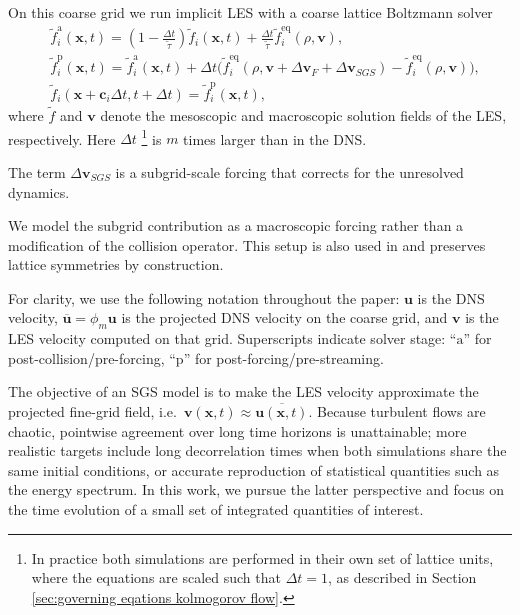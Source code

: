 \documentclass[]{elsarticle}
\begin{document}
On this coarse grid we run implicit LES with a coarse lattice Boltzmann solver
\begin{align}
     &\tilde{f}_i^{\text{a}}(\boldsymbol{x}, t)=\left(1-\frac{\Delta t}{\tilde{\tau}}\right) \tilde{f}_i(\boldsymbol{x}, t)+ 
    \frac{\Delta t}{\tilde{\tau}} \tilde{f}_i^{\text{eq}}(\rho, \boldsymbol{v}), \label{eq:LES-1}\\
    &\tilde{f}_i^{\text{p}}(\boldsymbol{x}, t) = \tilde{f}_i^{\text{a}}(\boldsymbol{x}, t) + \Delta t \bigg( \tilde{f}_i^{\text{eq}}(\rho, \boldsymbol{v} + \Delta \boldsymbol{v}_F + \Delta \boldsymbol{v}_{SGS}) - \tilde{f}_i^{\text{eq}}(\rho, \boldsymbol{v})\bigg), \label{eq:LES-2}\\
    &\tilde{f}_i\left(\boldsymbol{x}+\boldsymbol{c}_i \Delta t, t+\Delta t\right)=\tilde{f}_i^{\text{p}}(\boldsymbol{x}, t), \label{eq:LES-3}
\end{align}
where $\tilde{f}$ and $\boldsymbol{v}$ denote the mesoscopic and macroscopic solution fields of the LES, respectively. Here $\Delta t$ \footnote{In practice both simulations are performed in their own set of lattice units, where the equations are scaled such that $\Delta t = 1$, as described in Section \ref{sec:governing eqations kolmogorov flow}.} is $m$ times larger than in the DNS. 

The term $\Delta \boldsymbol{v}_{SGS}$ is a subgrid-scale forcing that corrects for the unresolved dynamics.

We model the subgrid contribution as a macroscopic forcing rather than a modification of the collision operator. This setup is also used in \cite{khan_physics-constrained_2026} and preserves lattice symmetries by construction.

For clarity, we use the following notation throughout the paper: $\boldsymbol{u}$ is the DNS velocity, $\overline{\boldsymbol{u}}=\phi_m\boldsymbol{u}$ is the projected DNS velocity on the coarse grid, and $\boldsymbol{v}$ is the LES velocity computed on that grid. Superscripts indicate solver stage: ``$\text{a}$'' for post-collision/pre-forcing, ``$\text{p}$'' for post-forcing/pre-streaming.

The objective of an SGS model is to make the LES velocity approximate the projected fine-grid field, i.e.\ $\boldsymbol{v}(\boldsymbol{x},t) \approx \overline{\boldsymbol{u}(\boldsymbol{x}, t)}$. Because turbulent flows are chaotic, pointwise agreement over long time horizons is unattainable; more realistic targets include long decorrelation times when both simulations share the same initial conditions, or accurate reproduction of statistical quantities such as the energy spectrum. In this work, we pursue the latter perspective and focus on the time evolution of a small set of integrated quantities of interest.
\end{document}
